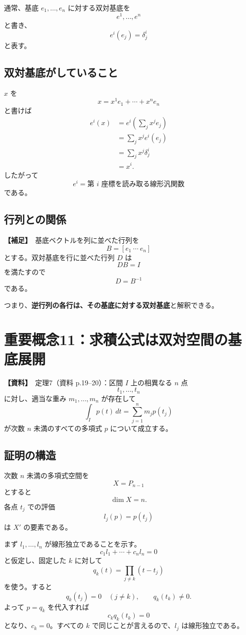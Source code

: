 \documentclass[a4paper,11pt]{ltjsarticle}
\newcommand{\sourceitem}{\textbf{【資料】}}
\newcommand{\suppitem}{\textbf{【補足】}}
\begin{document}
通常、基底 $e_1,\dots,e_n$ に対する双対基底を
\[
e^1,\dots,e^n
\]
と書き、
\[
\boxed{e^i(e_j)=\delta^i_j}
\]
と表す。

\subsection{双対基底がしていること}
$x$ を
\[
x=x^1e_1+\cdots+x^ne_n
\]
と書けば
\begin{align*}
e^i(x)
&=e^i\left(\sum_jx^je_j\right)\\
&=\sum_jx^je^i(e_j)\\
&=\sum_jx^j\delta^i_j\\
&=x^i.
\end{align*}
したがって
\[
\boxed{e^i=\text{第 $i$ 座標を読み取る線形汎関数}}
\]
である。

\subsection{行列との関係}
\suppitem\ 基底ベクトルを列に並べた行列を
\[
B=[e_1\ \cdots\ e_n]
\]
とする。双対基底を行に並べた行列 $D$ は
\[
DB=I
\]
を満たすので
\[
\boxed{D=B^{-1}}
\]
である。

つまり、\textbf{逆行列の各行は、その基底に対する双対基底}と解釈できる。

\section{重要概念11：求積公式は双対空間の基底展開}

\sourceitem\ 定理7（資料 p.19--20）：区間 $I$ 上の相異なる $n$ 点
\[
t_1,\dots,t_n
\]
に対し、適当な重み $m_1,\dots,m_n$ が存在して
\[
\boxed{
\int_I p(t)\,dt
=
\sum_{j=1}^n m_jp(t_j)
}
\]
が次数 $n$ 未満のすべての多項式 $p$ について成立する。

\subsection{証明の構造}
次数 $n$ 未満の多項式空間を
\[
X=P_{n-1}
\]
とすると
\[
\dim X=n.
\]
各点 $t_j$ での評価
\[
l_j(p)=p(t_j)
\]
は $X'$ の要素である。

まず $l_1,\dots,l_n$ が線形独立であることを示す。
\[
c_1l_1+\cdots+c_nl_n=0
\]
と仮定し、固定した $k$ に対して
\[
q_k(t)=\prod_{j\ne k}(t-t_j)
\]
を使う。すると
\[
q_k(t_j)=0\quad(j\ne k),\qquad q_k(t_k)\ne0.
\]
よって $p=q_k$ を代入すれば
\[
c_kq_k(t_k)=0
\]
となり、$c_k=0$。すべての $k$ で同じことが言えるので、$l_j$ は線形独立である。
\end{document}
